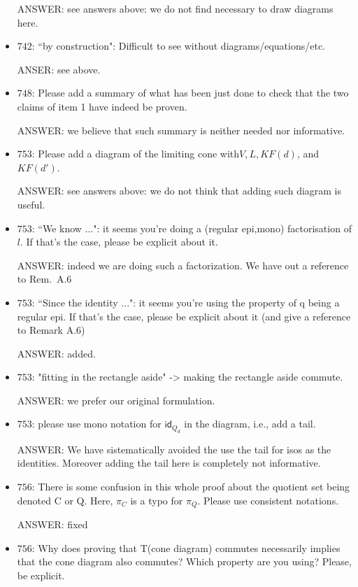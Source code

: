 \documentclass[english,11pt,a4paper]{article}
\begin{document}
\begin{itemize}
ANSWER: see answers above: we do not find necessary to draw diagrams here. 

\item $742$: ``by construction": Difficult to see without diagrams/equations/etc.

ANSER: see above.

\item $748$: Please add a summary of what has been just done to check that the two claims of item 1 have indeed be proven.

ANSWER: we believe that such summary is neither needed nor informative.

\item $753$: Please add a diagram of the limiting cone with$ V,L,KF(d)$, and $KF(d')$.

ANSWER:  see answers above: we do not think that adding such diagram is useful.

\item $753$: ``We know ...": it seems you're doing a (regular epi,mono) factorisation of $l$. If that's the case, please be explicit about it.

ANSWER: indeed we are doing such a factorization. We have out a reference to Rem.~A.6 

\item $753$: ``Since the identity ...": it seems you're using the property of q being a regular epi. If that's the case, please be explicit about it (and give a reference to Remark A.6)

ANSWER: added.

\item $753$: "fitting in the rectangle aside" -> making the rectangle aside commute.

ANSWER: we prefer our original formulation. 

\item $753$: please use mono notation for $\mathsf{id}_{Q_d}$ in the diagram, i.e., add a tail.

ANSWER: We have sistematically avoided the use the tail for isos as the identities. Moreover adding the tail here is completely not informative.


\item $756$: There is some confusion in this whole proof about the quotient set being denoted C or Q. Here, $\pi_C$ is a typo for $\pi_Q$. Please use consistent notations.

ANSWER: fixed


\item $756$: Why does proving that T(cone diagram) commutes necessarily implies that the cone diagram also commutes? Which property are you using? Please, be explicit.


\end{itemize}
\end{document}
